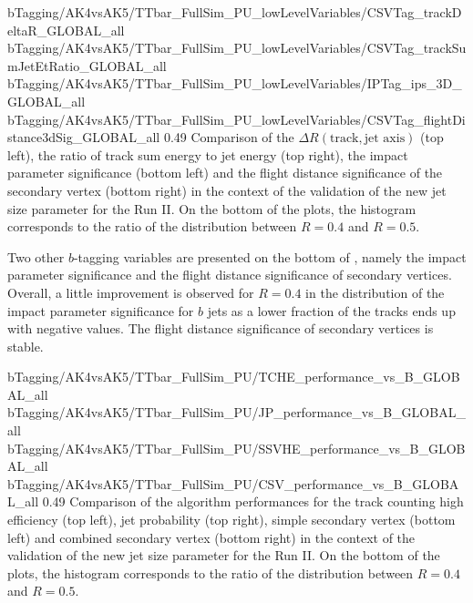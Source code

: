                       {bTagging/AK4vsAK5/TTbar_FullSim_PU_lowLevelVariables/CSVTag_trackDeltaR_GLOBAL_all}
                      {bTagging/AK4vsAK5/TTbar_FullSim_PU_lowLevelVariables/CSVTag_trackSumJetEtRatio_GLOBAL_all}
                      {bTagging/AK4vsAK5/TTbar_FullSim_PU_lowLevelVariables/IPTag_ips_3D_GLOBAL_all}
                      {bTagging/AK4vsAK5/TTbar_FullSim_PU_lowLevelVariables/CSVTag_flightDistance3dSig_GLOBAL_all}
                      {0.49}
                      {Comparison of the $\Delta R(\text{track},\text{jet axis})$ (top left),
                      the ratio of track sum energy to jet energy (top right), the impact parameter
                      significance (bottom left) and the flight distance significance of the
                      secondary vertex (bottom right) in the context of the validation
                      of the new jet size parameter for the Run II. On the bottom of the plots,
                      the histogram corresponds
                      to the ratio of the distribution between $R = 0.4$ and $R = 0.5$.}

    Two other $b$-tagging variables are presented on the bottom of
    , namely the
    impact parameter significance and the flight distance significance of secondary vertices.
    Overall, a little improvement is observed for $R = 0.4$ in the distribution of the impact
    parameter significance for $b$ jets as a lower fraction of the tracks ends up with
    negative values. The flight distance significance of secondary vertices is stable.

                      {bTagging/AK4vsAK5/TTbar_FullSim_PU/TCHE_performance_vs_B_GLOBAL_all}
                      {bTagging/AK4vsAK5/TTbar_FullSim_PU/JP_performance_vs_B_GLOBAL_all}
                      {bTagging/AK4vsAK5/TTbar_FullSim_PU/SSVHE_performance_vs_B_GLOBAL_all}
                      {bTagging/AK4vsAK5/TTbar_FullSim_PU/CSV_performance_vs_B_GLOBAL_all}
                      {0.49}
                      {Comparison of the algorithm performances for the track counting high
                      efficiency (top left), jet probability (top right), simple
                      secondary vertex (bottom left) and combined secondary vertex
                      (bottom right) in the context of the validation of the new jet size
                      parameter for the Run II. On the bottom of the plots, the histogram corresponds
                      to the ratio of the distribution between $R = 0.4$ and $R = 0.5$.
                      }

